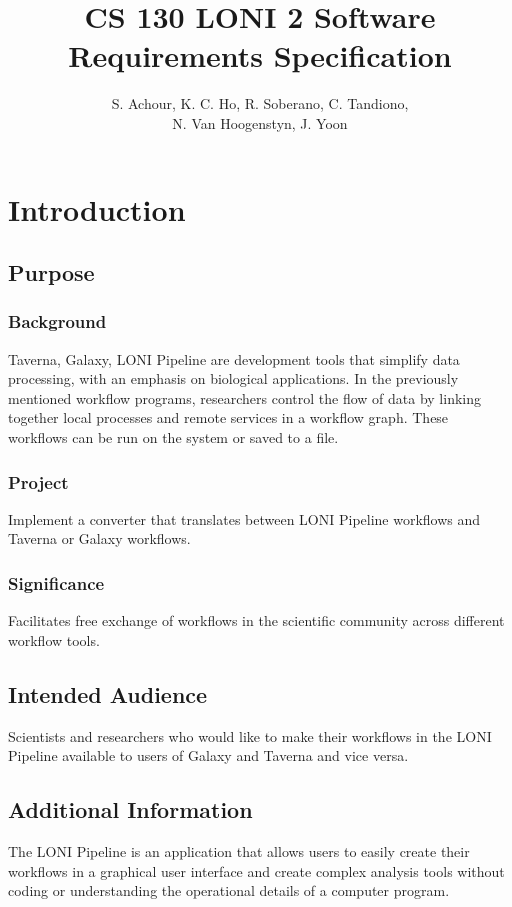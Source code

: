 \documentclass[12pt]{article}
\title{CS 130 LONI 2 Software Requirements Specification}
\author{S. Achour, K. C. Ho, R. Soberano, C. Tandiono,\\ N. Van Hoogenstyn, J. Yoon}
\begin{document}
\maketitle
\tableofcontents

\section{Introduction}
\subsection{Purpose}
\subsubsection{Background} Taverna, Galaxy, LONI Pipeline are development tools that simplify data processing, with an emphasis on biological applications. In the previously mentioned workflow programs, researchers control the flow of data by linking together local processes and remote services in a workflow graph. These workflows can be run on the system or saved to a file.
\subsubsection{Project} Implement a converter that translates between LONI Pipeline workflows and Taverna or Galaxy workflows.
\subsubsection{Significance} Facilitates free exchange of workflows in the scientific community across different workflow tools.


\subsection{Intended Audience}
Scientists and researchers who would like to make their workflows in the LONI Pipeline available to users of Galaxy and Taverna and vice versa.


\subsection{Additional Information}


The LONI Pipeline is an application that allows users to easily create their workflows in a graphical user interface and create complex analysis tools without coding or understanding the operational details of a computer program.
\end{document}
